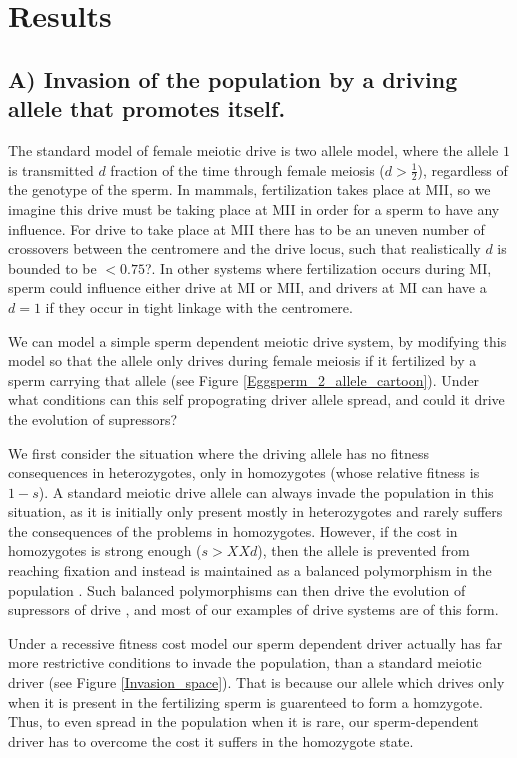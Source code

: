 \documentclass[12pt,letterpaper]{article}
\begin{document}
\section*{Results}

\subsection*{ A) Invasion of the population by a driving allele that promotes
itself.}



The standard model of female meiotic drive is two allele model, where the
allele $1$ is transmitted $d$ fraction of the time through female
meiosis ($d > \frac{1}{2}$), regardless of the genotype of the sperm. 
In mammals, fertilization takes place at MII, so we imagine this drive must be taking place at MII in order
for a sperm to have any influence. For drive to take place at MII there has to be an uneven number of
 crossovers between the centromere and the drive locus, such that realistically $d$ is bounded to be $<0.75$?. 
In other systems where fertilization occurs during MI, sperm could influence either drive at MI or MII, 
and drivers at MI can have a $d=1$ if they occur in tight linkage with the centromere.

We can model a simple sperm dependent meiotic drive system, by
modifying this model so that the allele only drives during female
meiosis if it fertilized by a sperm carrying that allele
 (see Figure \ref{Eggsperm_2_allele_cartoon}). Under what conditions can
this self propograting driver allele spread, and could it drive the
evolution of supressors? 

We first consider the situation where the driving allele has no
fitness consequences in heterozygotes, only in homozygotes (whose
relative fitness is $1-s$). A standard meiotic drive allele can always
invade the population in this situation, as it is initially only
present mostly in heterozygotes and rarely suffers the consequences of
the problems in homozygotes. However, if the cost in homozygotes is
strong enough ($s>XXd$), then the allele is prevented from reaching
fixation and instead is maintained as a balanced polymorphism in the
population \citep{Prout1973}. Such balanced polymorphisms can then
drive the evolution of supressors of drive \citep{XX}, and most of our
examples of drive systems are of this form. 

Under a recessive fitness cost model our sperm dependent driver
actually has far more restrictive conditions to invade the population,
than a standard meiotic driver (see Figure \ref{Invasion_space}).
That is because our allele which drives only when it is present in the
fertilizing sperm is guarenteed to form a homzygote. Thus, 
to even spread in the population when it is rare, our sperm-dependent
driver has to overcome the cost it suffers in the homozygote state.
\end{document}
